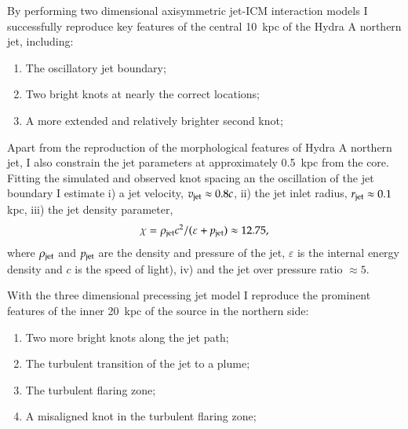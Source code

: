By performing two dimensional axisymmetric jet-ICM interaction models I successfully reproduce key features of the central 10~kpc of the Hydra A northern jet, including:
\begin{enumerate}
\item The oscillatory jet boundary;
\item Two bright knots at nearly the correct locations;
\item A more extended and relatively brighter second knot;
\end{enumerate}

Apart from the reproduction of the morphological features of Hydra A northern jet, I also constrain the jet parameters at approximately 0.5~kpc from the core. Fitting the simulated and observed knot spacing an the oscillation of the jet boundary I estimate i) a jet velocity, $v_{\rm jet} \approx 0.8c$, ii) the jet inlet radius, $r_{\rm jet} \approx 0.1$ kpc, iii) the jet density parameter, 
\begin{equation}
\chi =\rho_{\rm jet} c^2/(\varepsilon+p_{\rm jet}) \approx 12.75,
\end{equation}
where $\rho_{\rm jet}$ and $p_{\rm jet}$ are the density and pressure of the jet, $\varepsilon$ is the internal energy density and $c$ is the speed of light), iv) and the jet over pressure ratio $\approx 5$. 


With the three dimensional precessing jet model I reproduce the prominent features of the inner 20~kpc of the source in the northern side: 
\begin{enumerate}
\item Two more bright knots along the jet path;
\item The turbulent transition of the jet to a plume;
\item The turbulent flaring zone;
\item A misaligned knot in the turbulent flaring zone;
\end{enumerate}

